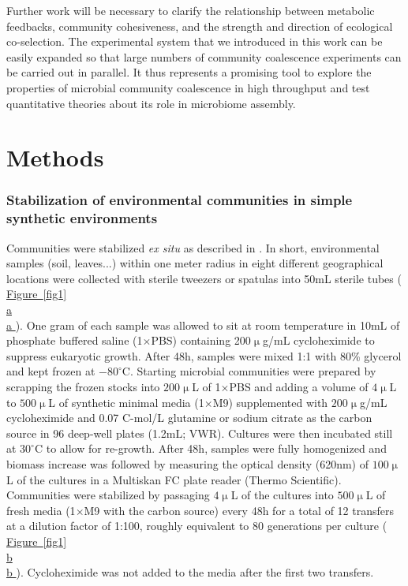 \documentclass[a4paper,10pt]{article}
\newcommand{\figref}[2][]{%
  \hyperref[{#2}]{%
    Figure~\ref*{#2}%
    \ifx\\#1\\%
    \else
      #1%
    \fi
  }%
}
\begin{document}
Further work will be necessary to clarify the relationship between
metabolic feedbacks, community cohesiveness, and
the strength and direction of ecological co-selection.
The experimental system that we introduced in this work can be easily expanded so that
large numbers of community coalescence experiments can be carried out in parallel.
It thus represents a promising tool to explore the properties of microbial community
coalescence in high throughput
and test quantitative theories about its role in microbiome assembly.

\clearpage











\section*{Methods}\label{methods}

\subsubsection*{Stabilization of environmental communities in simple synthetic environments}
\label{methods:community-assembly}

Communities were stabilized \textit{ex situ} as described in \cite{Goldford2018}.
In short, environmental samples (soil, leaves...) within one meter radius in eight different
geographical locations were collected with sterile
tweezers or spatulas into 50mL sterile tubes (\figref[a]{fig1}).
One gram of each sample was allowed to
sit at room temperature in 10mL of phosphate buffered saline (1$\times$PBS) containing
200$\upmu$g/mL cycloheximide to suppress eukaryotic growth.
After 48h, samples were mixed 1:1 with 80\% glycerol and kept frozen at $-80^\circ$C.
Starting microbial communities were prepared by scrapping the frozen stocks into
$200\upmu$L of 1$\times$PBS and adding a volume of $4\upmu$L to $500\upmu$L
of synthetic minimal media (1$\times$M9) supplemented with $200\upmu$g/mL cycloheximide
and 0.07 C-mol/L glutamine or sodium citrate as the carbon source in 96 deep-well plates
(1.2mL; VWR).
Cultures were then incubated still at $30^\circ$C to allow for re-growth.
After 48h, samples were fully homogenized and biomass increase was followed by measuring
the optical density (620nm) of $100\upmu$L of the cultures in a Multiskan FC plate reader
(Thermo Scientific).
Communities were stabilized \cite{Goldford2018} by passaging $4\upmu$L of the cultures into
$500\upmu$L of fresh media (1$\times$M9 with the carbon source)  every 48h for a total of
12 transfers at a dilution factor of 1:100,
roughly equivalent to 80 generations per culture (\figref[b]{fig1}).
Cycloheximide was not added to the media after the first two transfers.
\end{document}
